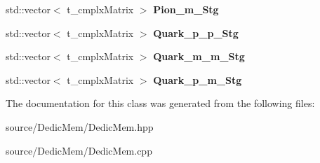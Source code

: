 \begin{DoxyCompactItemize}
\item 
\hypertarget{class_c___dedic_mem__1___loop_diagram_a313d8e7bc100e7e96b61a6a990482e99}{std\-::vector$<$ t\-\_\-cmplx\-Matrix $>$ {\bfseries Pion\-\_\-m\-\_\-\-Stg}}\label{class_c___dedic_mem__1___loop_diagram_a313d8e7bc100e7e96b61a6a990482e99}

\item 
\hypertarget{class_c___dedic_mem__1___loop_diagram_a50f4ff8296831334b58afc83b27f0622}{std\-::vector$<$ t\-\_\-cmplx\-Matrix $>$ {\bfseries Quark\-\_\-p\-\_\-p\-\_\-\-Stg}}\label{class_c___dedic_mem__1___loop_diagram_a50f4ff8296831334b58afc83b27f0622}

\item 
\hypertarget{class_c___dedic_mem__1___loop_diagram_a716d1dbc52eb7c47b25ac6884402d3a3}{std\-::vector$<$ t\-\_\-cmplx\-Matrix $>$ {\bfseries Quark\-\_\-m\-\_\-m\-\_\-\-Stg}}\label{class_c___dedic_mem__1___loop_diagram_a716d1dbc52eb7c47b25ac6884402d3a3}

\item 
\hypertarget{class_c___dedic_mem__1___loop_diagram_a121469bfcd4a8293397a3ff2a223642d}{std\-::vector$<$ t\-\_\-cmplx\-Matrix $>$ {\bfseries Quark\-\_\-p\-\_\-m\-\_\-\-Stg}}\label{class_c___dedic_mem__1___loop_diagram_a121469bfcd4a8293397a3ff2a223642d}

\end{DoxyCompactItemize}


The documentation for this class was generated from the following files\-:\begin{DoxyCompactItemize}
\item 
source/\-Dedic\-Mem/Dedic\-Mem.\-hpp\item 
source/\-Dedic\-Mem/Dedic\-Mem.\-cpp\end{DoxyCompactItemize}
